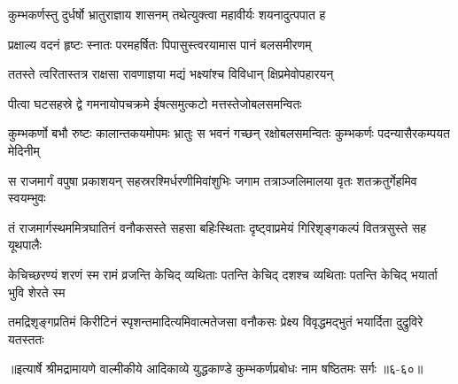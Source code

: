 \twolineshloka
{कुम्भकर्णस्तु दुर्धर्षो भ्रातुराज्ञाय शासनम्}
{तथेत्युक्त्वा महावीर्यः शयनादुत्पपात ह} %

\twolineshloka
{प्रक्षाल्य वदनं हृष्टः स्नातः परमहर्षितः}
{पिपासुस्त्वरयामास पानं बलसमीरणम्} %

\twolineshloka
{ततस्ते त्वरितास्तत्र राक्षसा रावणाज्ञया}
{मद्यं भक्ष्यांश्च विविधान् क्षिप्रमेवोपहारयन्} %

\twolineshloka
{पीत्वा घटसहस्रे द्वे गमनायोपचक्रमे}
{ईषत्समुत्कटो मत्तस्तेजोबलसमन्वितः} %

\threelineshloka
{कुम्भकर्णो बभौ रुष्टः कालान्तकयमोपमः}
{भ्रातुः स भवनं गच्छन् रक्षोबलसमन्वितः}
{कुम्भकर्णः पदन्यासैरकम्पयत मेदिनीम्} %

\twolineshloka
{स राजमार्गं वपुषा प्रकाशयन् सहस्ररश्मिर्धरणीमिवांशुभिः}
{जगाम तत्राञ्जलिमालया वृतः शतक्रतुर्गेहमिव स्वयम्भुवः} %

\twolineshloka
{तं राजमार्गस्थममित्रघातिनं वनौकसस्ते सहसा बहिःस्थिताः}
{दृष्ट्वाप्रमेयं गिरिशृङ्गकल्पं वितत्रसुस्ते सह यूथपालैः} %

\twolineshloka
{केचिच्छरण्यं शरणं स्म रामं व्रजन्ति केचिद् व्यथिताः पतन्ति}
{केचिद् दशश्च व्यथिताः पतन्ति केचिद् भयार्ता भुवि शेरते स्म} %

\twolineshloka
{तमद्रिशृङ्गप्रतिमं किरीटिनं स्पृशन्तमादित्यमिवात्मतेजसा}
{वनौकसः प्रेक्ष्य विवृद्धमद्भुतं भयार्दिता दुद्रुविरे यतस्ततः} %


॥इत्यार्षे श्रीमद्रामायणे वाल्मीकीये आदिकाव्ये युद्धकाण्डे कुम्भकर्णप्रबोधः नाम षष्ठितमः सर्गः ॥६-६०॥
